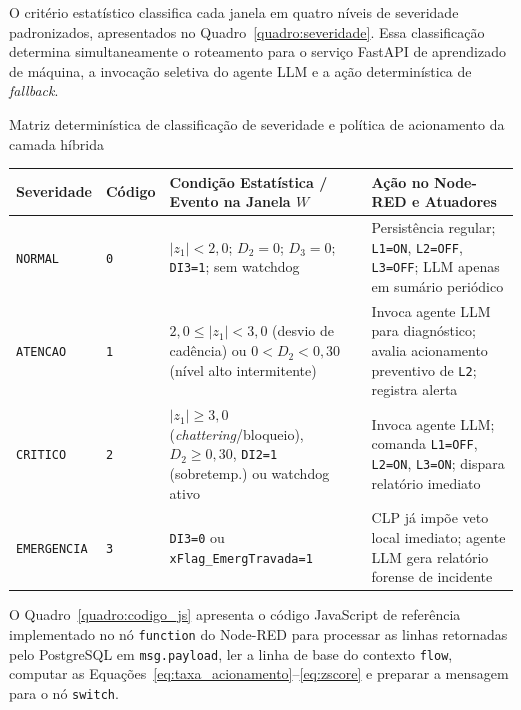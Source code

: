 O critério estatístico classifica cada janela em quatro níveis de severidade padronizados, apresentados no Quadro~\ref{quadro:severidade}. Essa classificação determina simultaneamente o roteamento para o serviço FastAPI de aprendizado de máquina, a invocação seletiva do agente LLM e a ação determinística de \textit{fallback}.

\begin{quadro}[htb]
  \centering
  \SingleSpacing
  \caption{Matriz determinística de classificação de severidade e política de acionamento da camada híbrida}
  \label{quadro:severidade}
  \footnotesize
  \begin{tabularx}{\textwidth}{|p{2.2cm}|p{1.3cm}|L|p{3.6cm}|}
    \hline
    \textbf{Severidade} & \textbf{Código} & \textbf{Condição Estatística / Evento na Janela $W$} & \textbf{Ação no Node-RED e Atuadores} \\
    \hline
    \texttt{NORMAL} & \texttt{0} & $|z_1| < 2{,}0$; $D_2 = 0$; $D_3 = 0$; \texttt{DI3=1}; sem watchdog & Persistência regular; \texttt{L1=ON}, \texttt{L2=OFF}, \texttt{L3=OFF}; LLM apenas em sumário periódico \\
    \hline
    \texttt{ATENCAO} & \texttt{1} & $2{,}0 \le |z_1| < 3{,}0$ (desvio de cadência) ou $0 < D_2 < 0{,}30$ (nível alto intermitente) & Invoca agente LLM para diagnóstico; avalia acionamento preventivo de \texttt{L2}; registra alerta \\
    \hline
    \texttt{CRITICO} & \texttt{2} & $|z_1| \ge 3{,}0$ (\textit{chattering}/bloqueio), $D_2 \ge 0{,}30$, \texttt{DI2=1} (sobretemp.) ou watchdog ativo & Invoca agente LLM; comanda \texttt{L1=OFF}, \texttt{L2=ON}, \texttt{L3=ON}; dispara relatório imediato \\
    \hline
    \texttt{EMERGENCIA} & \texttt{3} & \texttt{DI3=0} ou \texttt{xFlag\_EmergTravada=1} & CLP já impõe veto local imediato; agente LLM gera relatório forense de incidente \\
    \hline
  \end{tabularx}
\end{quadro}

O Quadro~\ref{quadro:codigo_js} apresenta o código JavaScript de referência implementado no nó \texttt{function} do Node-RED para processar as linhas retornadas pelo PostgreSQL em \texttt{msg.payload}, ler a linha de base do contexto \texttt{flow}, computar as Equações~\eqref{eq:taxa_acionamento}--\eqref{eq:zscore} e preparar a mensagem para o nó \texttt{switch}.

